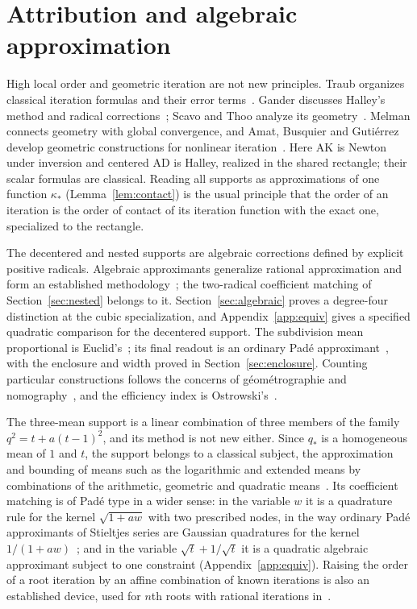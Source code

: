\section{Attribution and algebraic approximation}\label{sec:attribution}

High local order and geometric iteration are not new principles. Traub organizes classical iteration
formulas and their error terms~\cite{traub61,traub64}. Gander discusses Halley's method and radical
corrections~\cite{gander}; Scavo and Thoo analyze its geometry~\cite{scavo}. Melman connects geometry
with global convergence, and Amat, Busquier and Guti\'errez develop geometric constructions for
nonlinear iteration~\cite{melman,amat}. Here AK is Newton under inversion and centered AD is Halley,
realized in the shared rectangle; their scalar formulas are classical. Reading all supports as
approximations of one function $\kappa_*$ (Lemma~\ref{lem:contact}) is the usual principle that the
order of an iteration is the order of contact of its iteration function with the exact one, specialized
to the rectangle.

The decentered and nested supports are algebraic corrections defined by explicit positive radicals.
Algebraic approximants generalize rational approximation and form an established
methodology~\cite{sergeev,shafer}; the two-radical coefficient matching of Section~\ref{sec:nested}
belongs to it. Section~\ref{sec:algebraic} proves a degree-four distinction at the cubic
specialization, and Appendix~\ref{app:equiv} gives a specified quadratic comparison for the decentered
support. The subdivision mean proportional is Euclid's~\cite{euclid}; its final readout is an ordinary
Pad\'e approximant~\cite{dlmf,baker}, with the enclosure and width proved in
Section~\ref{sec:enclosure}. Counting particular constructions follows the concerns of
g\'eom\'etrographie and nomography~\cite{lemoine,ocagne}, and the efficiency index is
Ostrowski's~\cite{ostrowski}.

The three-mean support is a linear combination of three members of the family
$q^{2}=t+a(t-1)^{2}$, and its method is not new either. Since $q_*$ is a homogeneous mean of $1$ and
$t$, the support belongs to a classical subject, the approximation and bounding of means such as the
logarithmic and extended means by combinations of the arithmetic, geometric and quadratic
means~\cite{carlson,stolarsky}. Its coefficient matching is of Pad\'e type in a wider sense: in the
variable $w$ it is a quadrature rule for the kernel $\sqrt{1+aw}$ with two prescribed nodes, in the way
ordinary Pad\'e approximants of Stieltjes series are Gaussian quadratures for the kernel
$1/(1+aw)$~\cite{baker}; and in the variable $\sqrt t+1/\sqrt t$ it is a quadratic algebraic approximant
subject to one constraint (Appendix~\ref{app:equiv}). Raising the order of a root iteration by an affine
combination of known iterations is also an established device, used for $n$th roots with rational
iterations in~\cite{dubeau}.

